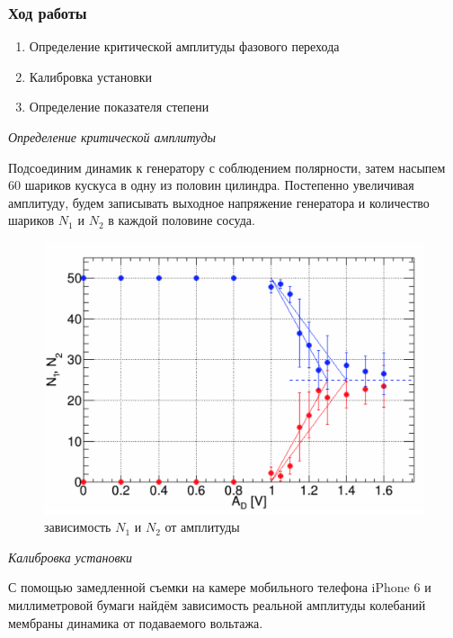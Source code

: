 \documentclass[a4paper, 12pt]{article}
\begin{document}
\subsubsection*{Ход работы}

\begin{enumerate}
	\item Определение критической амплитуды фазового перехода
	\item Калибровка установки
	\item Определение показателя степени
\end{enumerate}

\emph{Определение критической амплитуды}

Подсоединим динамик к генератору с соблюдением полярности, затем насыпем 60 шариков кускуса в одну из половин цилиндра. Постепенно увеличивая амплитуду, будем записывать выходное напряжение генератора и количество шариков $N_1$ и $N_2$ в каждой половине сосуда.

\begin{figure}
	\includegraphics[scale=0.5]{img/N(A).jpg}
	\caption{зависимость $N_1$ и $N_2$ от амплитуды}
\end{figure}

\emph{Калибровка установки}

С помощью замедленной съемки на камере мобильного телефона iPhone 6 и миллиметровой бумаги найдём зависимость реальной амплитуды колебаний мембраны динамика от подаваемого вольтажа.
\end{document}
